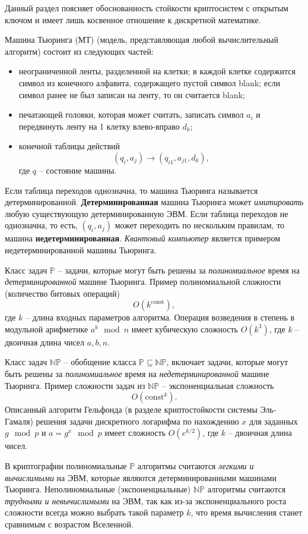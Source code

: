 \documentclass[10pt,a4paper]{book}
\newcommand{\set}[1]{\mathbb{#1}}
\begin{document}
Данный раздел поясняет обоснованность стойкости криптосистем с открытым ключом и имеет лишь косвенное отношение к дискретной математике.

Машина Тьюринга (МТ) (модель, представляющая любой вычислительный алгоритм) состоит из следующих частей:
\begin{itemize}
    \item неограниченной ленты, разделенной на клетки; в каждой клетке содержится символ из конечного алфавита, содержащего пустой символ blank; если символ ранее не был записан на ленту, то он считается blank;
    \item печатающей головки, которая может считать, записать символ $a_i$ и передвинуть ленту на 1 клетку влево-вправо $d_k$;
    \item конечной таблицы действий
    \[ (q_i, a_j) \rightarrow (q_{i1}, a_{j1}, d_k), \]
где $q$ -- состояние машины.
\end{itemize}

Если таблица переходов однозначна, то машина Тьюринга называется детерминированной. \textbf{Детерминированная} машина Тьюринга может \emph{имитировать} любую существующую детерминированную ЭВМ. Если таблица переходов не однозначна, то есть, $(q_i, a_j)$ может переходить по нескольким правилам, то машина \textbf{недетерминированная}. \emph{Квантовый компьютер} является примером недетерминированной машины Тьюринга.

Класс задач $\set{P}$ -- задачи, которые могут быть решены за \emph{полиномиальное} время на \emph{детерминированной} машине Тьюринга. Пример полиномиальной сложности (количество битовых операций)
    \[ O(k^{\textrm{const}}), \]
где $k$ -- длина входных параметров алгоритма. Операция возведения в степень в модульной арифметике $a^b \mod n$ имеет кубическую сложность $O(k^3)$, где $k$ -- двоичная длина чисел $a,b,n$.

Класс задач $\set{NP}$ -- обобщение класса $\set{P} \subseteq \set{NP}$, включает задачи, которые могут быть решены за \emph{полиномиальное} время на \emph{недетерминированной} машине Тьюринга. Пример сложности задач из $\set{NP}$ -- экспоненциальная сложность
    \[ O(\textrm{const}^k). \]
Описанный алгоритм Гельфонда (в разделе криптостойкости системы Эль-Гамаля) решения задачи дискретного логарифма по нахождению $x$ для заданных $g \mod p$ и $a = g^x \mod p$ имеет сложность $O(e^{k/2})$, где $k$ -- двоичная длина чисел.

В криптографии полиномиальные $\set{P}$ алгоритмы считаются \emph{легкими и вычислимыми} на ЭВМ, которые являются детерминированными машинами Тьюринга. Неполиномиальные (экспоненциальные) $\set{NP}$ алгоритмы считаются \emph{трудными и невычислимыми} на ЭВМ, так как из-за экспоненциального роста сложности всегда можно выбрать такой параметр $k$, что время вычисления станет сравнимым с возрастом Вселенной.
\end{document}
